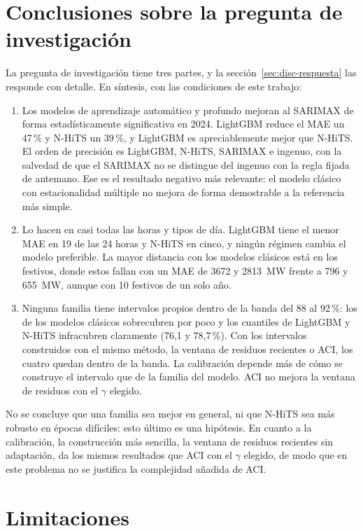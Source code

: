 \section{Conclusiones sobre la pregunta de investigación}\label{sec:concl-pregunta}

La pregunta de investigación tiene tres partes, y la
sección~\ref{sec:disc-respuesta} las responde con detalle. En síntesis, con las
condiciones de este trabajo:

\begin{enumerate}
	\item Los modelos de aprendizaje automático y profundo mejoran al SARIMAX de
	forma estadísticamente significativa en 2024. LightGBM reduce el MAE un 47\,\%
	y N-HiTS un 39\,\%, y LightGBM es apreciablemente mejor que N-HiTS. El orden
	de precisión es LightGBM, N-HiTS, SARIMAX e ingenuo, con la salvedad de que
	el SARIMAX no se distingue del ingenuo con la regla fijada de antemano. Ese es
	el resultado negativo más relevante: el modelo clásico con estacionalidad
	múltiple no mejora de forma demostrable a la referencia más simple.
	\item Lo hacen en casi todas las horas y tipos de día. LightGBM tiene el menor
	MAE en 19 de las 24 horas y N-HiTS en cinco, y ningún régimen cambia el modelo
	preferible. La mayor distancia con los modelos clásicos está en los festivos,
	donde estos fallan con un MAE de 3672 y 2813~MW frente a 796 y 655~MW, aunque
	con 10 festivos de un solo año.
	\item Ninguna familia tiene intervalos propios dentro de la banda del 88 al
	92\,\%: los de los modelos clásicos sobrecubren por poco y los cuantiles de
	LightGBM y N-HiTS infracubren claramente (76,1 y 78,7\,\%). Con los intervalos
	construidos con el mismo método, la ventana de residuos recientes o ACI, los
	cuatro quedan dentro de la banda. La calibración depende más de cómo se
	construye el intervalo que de la familia del modelo. ACI no mejora la ventana
	de residuos con el $\gamma$ elegido.
\end{enumerate}

No se concluye que una familia sea mejor en general, ni que N-HiTS sea más
robusto en épocas difíciles: esto último es una hipótesis. En cuanto a la
calibración, la construcción más sencilla, la ventana de residuos recientes sin
adaptación, da los mismos resultados que ACI con el $\gamma$ elegido, de modo
que en este problema no se justifica la complejidad añadida de ACI.

\section{Limitaciones}\label{sec:concl-limitaciones}

